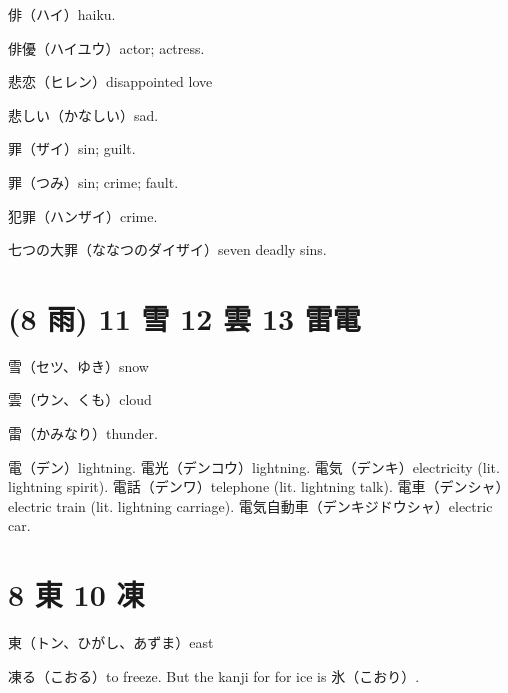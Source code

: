 俳（ハイ）haiku.

俳優（ハイユウ）actor; actress.

悲恋（ヒレン）disappointed love

悲しい（かなしい）sad.

罪（ザイ）sin; guilt.

罪（つみ）sin; crime; fault.

犯罪（ハンザイ）crime.

七つの大罪（ななつのダイザイ）seven deadly sins.

\section{(8 雨) 11 雪 12 雲 13 雷電}

雪（セツ、ゆき）snow

雲（ウン、くも）cloud

雷（かみなり）thunder.

電（デン）lightning.
電光（デンコウ）lightning.
電気（デンキ）electricity (lit. lightning spirit).
電話（デンワ）telephone (lit. lightning talk).
電車（デンシャ）electric train (lit. lightning carriage).
電気自動車（デンキジドウシャ）electric car.

\section{8 東 10 凍}

東（トン、ひがし、あずま）east

凍る（こおる）to freeze.
But the kanji for for ice is 氷（こおり）.
